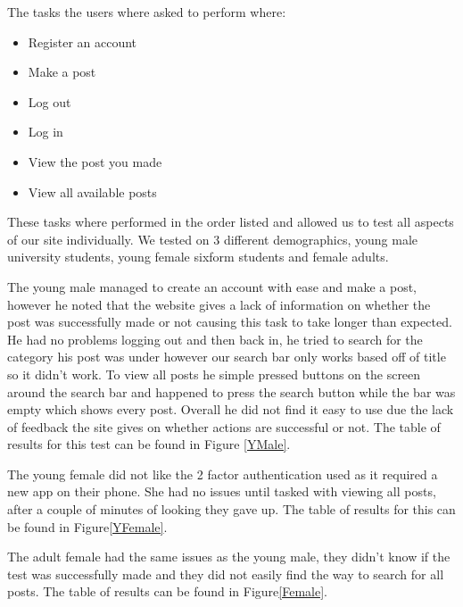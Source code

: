 \documentclass{cmpstyle}
\begin{document}
The tasks the users where asked to perform where:
\begin{itemize}
	\item Register an account
	\item Make a post
	\item Log out
	\item Log in
	\item View the post you made
	\item View all available posts
\end{itemize}
These tasks where performed in the order listed and allowed us to test all aspects of our site individually. We tested on 3 different demographics, young male university students, young female sixform students and female adults. 

The young male managed to create an account with ease and make a post, however he noted that the website gives a lack of information on whether the post was successfully made or not causing this task to take longer than expected. He had no problems logging out and then back in, he tried to search for the category his post was under however our search bar only works based off of title so it didn't work. To view all posts he simple pressed buttons on the screen around the search bar and happened to press the search button while the bar was empty which shows every post. Overall he did not find it easy to use due the lack of feedback the site gives on whether actions are successful or not. The table of results for this test can be found in Figure \ref{YMale}.

The young female did not like the 2 factor authentication used as it required a new app on their phone. She had no issues until tasked with viewing all posts, after a couple of minutes of looking they gave up. The table of results for this can be found in Figure\ref{YFemale}.

The adult female had the same issues as the young male, they didn't know if the test was successfully made and they did not easily find the way to search for all posts. The table of results can be found in Figure\ref{Female}.
\end{document}
